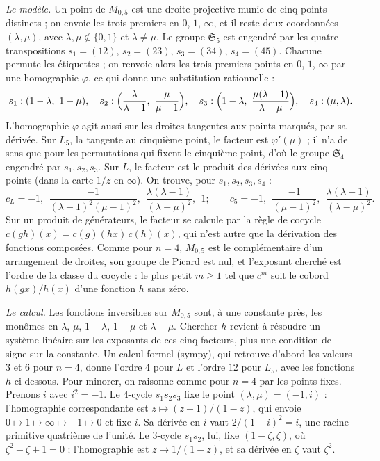 \noindent\emph{Le modèle.} Un point de $M_{0,5}$ est une droite projective munie de cinq points distincts ; on envoie les trois premiers en $0$, $1$, $\infty$, et il reste deux coordonnées $(\lambda, \mu)$, avec $\lambda, \mu \notin \{0, 1\}$ et $\lambda \neq \mu$. Le groupe $\mathfrak S_5$ est engendré par les quatre transpositions $s_1 = (12)$, $s_2 = (23)$, $s_3 = (34)$, $s_4 = (45)$. Chacune permute les étiquettes ; on renvoie alors les trois premiers points en $0$, $1$, $\infty$ par une homographie $\varphi$, ce qui donne une substitution rationnelle :
\[
s_1 : (1 - \lambda,\ 1 - \mu), \quad s_2 : \Bigl(\frac{\lambda}{\lambda - 1},\ \frac{\mu}{\mu - 1}\Bigr), \quad s_3 : \Bigl(1 - \lambda,\ \frac{\mu(\lambda - 1)}{\lambda - \mu}\Bigr), \quad s_4 : (\mu, \lambda).
\]
L'homographie $\varphi$ agit aussi sur les droites tangentes aux points marqués, par sa dérivée. Sur $L_5$, la tangente au cinquième point, le facteur est $\varphi'(\mu)$ ; il n'a de sens que pour les permutations qui fixent le cinquième point, d'où le groupe $\mathfrak S_4$ engendré par $s_1, s_2, s_3$. Sur $L$, le facteur est le produit des dérivées aux cinq points (dans la carte $1/z$ en $\infty$). On trouve, pour $s_1, s_2, s_3, s_4$ :
\[
c_L = -1,\ \ \frac{-1}{(\lambda - 1)^2(\mu - 1)^2},\ \ \frac{\lambda(\lambda - 1)}{(\lambda - \mu)^2},\ \ 1 ; \qquad
c_5 = -1,\ \ \frac{-1}{(\mu - 1)^2},\ \ \frac{\lambda(\lambda - 1)}{(\lambda - \mu)^2}.
\]
Sur un produit de générateurs, le facteur se calcule par la règle de cocycle $c(gh)(x) = c(g)(hx)\,c(h)(x)$, qui n'est autre que la dérivation des fonctions composées. Comme pour $n = 4$, $M_{0,5}$ est le complémentaire d'un arrangement de droites, son groupe de Picard est nul, et l'exposant cherché est l'ordre de la classe du cocycle : le plus petit $m \geq 1$ tel que $c^m$ soit le cobord $h(gx)/h(x)$ d'une fonction $h$ sans zéro.

\noindent\emph{Le calcul.} Les fonctions inversibles sur $M_{0,5}$ sont, à une constante près, les monômes en $\lambda$, $\mu$, $1 - \lambda$, $1 - \mu$ et $\lambda - \mu$. Chercher $h$ revient à résoudre un système linéaire sur les exposants de ces cinq facteurs, plus une condition de signe sur la constante. Un calcul formel (sympy), qui retrouve d'abord les valeurs $3$ et $6$ pour $n = 4$, donne l'ordre $4$ pour $L$ et l'ordre $12$ pour $L_5$, avec les fonctions $h$ ci-dessous. Pour minorer, on raisonne comme pour $n = 4$ par les points fixes. Prenons $i$ avec $i^2 = -1$. Le $4$-cycle $s_1 s_2 s_3$ fixe le point $(\lambda, \mu) = (-1, i)$ : l'homographie correspondante est $z \mapsto (z + 1)/(1 - z)$, qui envoie $0 \mapsto 1 \mapsto \infty \mapsto -1 \mapsto 0$ et fixe $i$. Sa dérivée en $i$ vaut $2/(1 - i)^2 = i$, une racine primitive quatrième de l'unité. Le $3$-cycle $s_1 s_2$, lui, fixe $(1 - \zeta, \zeta)$, où $\zeta^2 - \zeta + 1 = 0$ ; l'homographie est $z \mapsto 1/(1 - z)$, et sa dérivée en $\zeta$ vaut $\zeta^2$.

